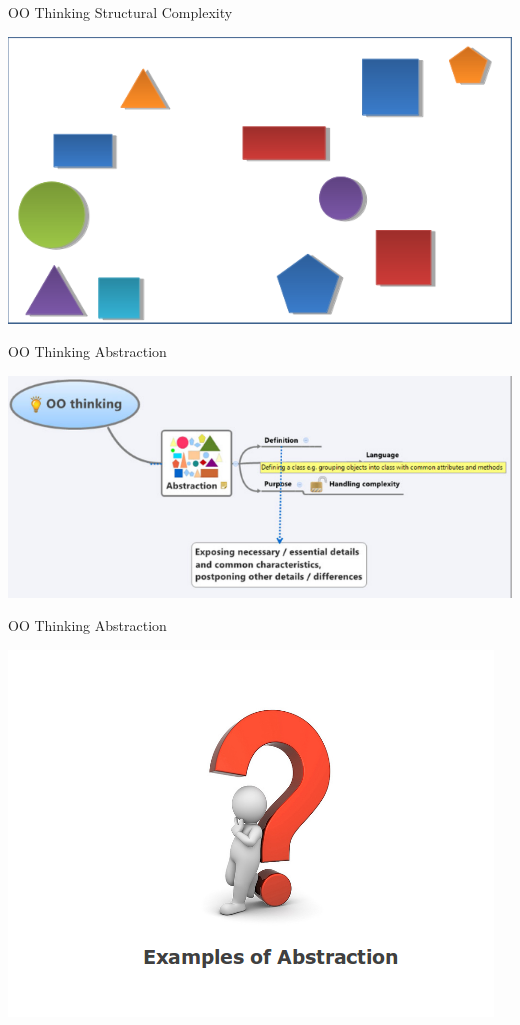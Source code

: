 \documentclass[14pt]{beamer}
\begin{document}
\begin{frame}{OO Thinking}
Structural Complexity
\begin{center}
    \includegraphics[scale=0.5]{Image7.png}
\end{center}
\end{frame}
\begin{frame}{OO Thinking}
Abstraction
\begin{center}
    \includegraphics[scale=0.5]{Image8.png}
\end{center}
\end{frame}
\begin{frame}{OO Thinking}
Abstraction
\begin{center}
    \includegraphics[scale=0.5]{Image9.png}
\end{center}
\end{frame}
\end{document}
